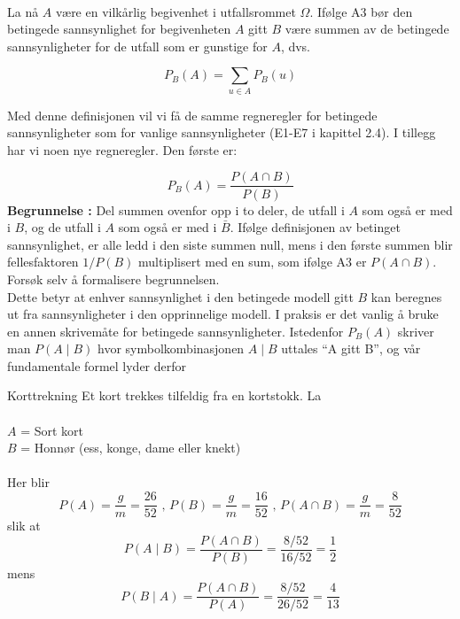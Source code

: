\\[0.2cm]
\noindent La nå $A$ være en vilkårlig begivenhet i utfallsrommet $\Omega$.
Ifølge A3 bør den betingede sannsynlighet for begivenheten $A$ gitt
$B$ være summen av de betingede sannsynligheter for de utfall som
er gunstige for $A$, dvs.

\[     P_B(A)=\sum_{u\in A}P_B(u) \]

\noindent Med denne definisjonen vil vi få de samme regneregler for
betingede sannsynligheter som for vanlige sannsynligheter (E1-E7
i kapittel 2.4). I tillegg har vi noen nye regneregler. Den første er:

\[ P_B(A)=\frac{P(A \cap B)}{P(B)} \]
{\bf Begrunnelse :} Del summen ovenfor opp i to deler, de utfall i $A$ som 
også er med i $B$, og de utfall i $A$ som også er med i $\bar{B}$.
Ifølge definisjonen av betinget sannsynlighet, er alle ledd i den siste
summen null, mens  i den første summen blir fellesfaktoren $1/P(B)$
multiplisert med en sum, som ifølge A3 er $P(A \cap B)$. Forsøk selv
å formalisere begrunnelsen.\\

Dette betyr at enhver sannsynlighet i den betingede
modell gitt $B$ kan beregnes ut fra sannsynligheter i den
opprinnelige modell.
I praksis er det vanlig å bruke en annen skrivemåte for betingede
sannsynligheter. Istedenfor $P_B(A)$ skriver man $P(A\mid B)$
hvor symbolkombinasjonen $A\mid B$ uttales ``A gitt B'', og vår
fundamentale formel lyder derfor 

\begin{center} \framebox[10cm]{\begin{minipage}{9cm}
\[ \mbox{\ \ \ E8. \ \ \ \ } P(A \mid B)=\frac{P(A \cap B)}{P(B)}  \]
 \mbox{} \end{minipage}} \end{center}


\begin{eksempel}{Korttrekning}
Et kort trekkes tilfeldig fra en kortstokk. La \\ \\
\indent     $A$ = Sort kort \\
\indent     $B$ = Honnør (ess, konge, dame eller knekt) \\ \\
\noindent Her blir
\[  P(A)=\frac{g}{m}=\frac{26}{52} \mbox{ , }
 P(B)=\frac{g}{m}=\frac{16}{52}\mbox{ , }P(A\cap B)=\frac{g}{m}=\frac{8}{52} \]
\noindent slik at
\[ P(A \mid B)=\frac{P(A \cap B)}{P(B)}=\frac{8/52}{16/52}=\frac{1}{2} \]
\noindent mens
\[ P(B \mid A)=\frac{P(A \cap B)}{P(A)}=\frac{8/52}{26/52}=\frac{4}{13} \]
\end{eksempel}

